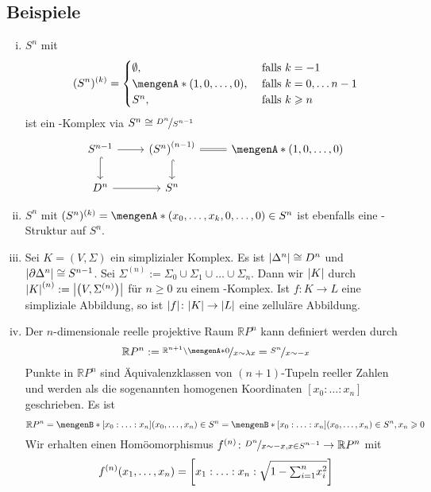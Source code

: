 \subsection[Beispiele für \CW-Komplexe]{Beispiele} %
\label{sub:115}
\begin{enumerate}[(i)]
	\item $S^n$ mit 
	\[
		(S^n)^{(k)} = \begin{cases}
			\emptyset, &\text{ falls }k=-1\\
			\set{(1,0,\ldots ,0)}, &\text{ falls } k=0, \ldots n-1 \\
			S^n , &\text{ falls } k \ge n 
		\end{cases}
	\]
	ist ein \CW-Komplex via $S^n \cong \nicefrac{D^n}{S^{n-1}}$
	\[
		\begin{tikzcd}
			S^{n-1} \rar \dar[hook] & \enbrace*{S^n}^{(n-1)} \rar[equal] \dar[hook] & \set{(1,0,\ldots ,0)}   \\
			D^n \rar & S^n  
		\end{tikzcd}
	\]
	\item $S^n$ mit $(S^n)^{(k)} = \set{(x_0, \ldots ,x_k,0, \ldots ,0) \in S^n} $ ist ebenfalls eine \CW-Struktur auf $S^n$.
	\item Sei $K=(V,\Sigma)$ ein simplizialer Komplex. Es ist $\abs*{\Delta^n} \cong D^n$ und $\abs*{\partial \Delta^n} \cong S^{n-1}$. Sei 
	$\Sigma^{(n)} := \Sigma_0 \cup \Sigma_1 \cup \ldots \cup \Sigma_n$. Dann wir $\abs*{K}$ durch $\abs*{K}^{(n)} := \abs*{\enbrace*{V,\Sigma^{(n)}}}$ für $n \ge 0$ zu 
	einem \CW-Komplex. Ist $f \colon K \to L$ eine simpliziale Abbildung, so ist $\abs*{f} \colon \abs*{K} \to \abs*{L}$ eine zelluläre Abbildung.
	\item Der $n$-dimensionale reelle projektive Raum $\mathds{R}P^n$ kann definiert werden durch 
	\[
		\mathds{R}P^n := \nicefrac{\mathds{R}^{n+1} \setminus \set{0}}{x \sim \lambda x} = \nicefrac{S^n}{x \sim -x}
	\]
	Punkte in $\mathds{R}P^n$ sind Äquivalenzklassen von $(n+1)$-Tupeln reeller Zahlen und werden als die sogenannten homogenen Koordinaten $[x_0 : \ldots : x_n]$ 
	geschrieben. Es ist 
	\[
		\mathds{R}P^n = \set[{[x_0 : \ldots : x_n]}]{(x_0, \ldots ,x_n) \in S^n \rule{0cm}{1em}} 
		= \set[{[x_0 : \ldots : x_n]}]{(x_0, \ldots ,x_n) \in S^n, x_n \ge 0 \rule{0cm}{1em}}
	\]
	Wir erhalten einen Homöomorphismus $f^{(n)} \colon \nicefrac{D^n}{x \sim -x, x \in S^{n-1}} \to \mathds{R}P^n$ mit
	\[
		f^{(n)} \enbrace*{x_1, \ldots ,x_n} = \benbrace*{x_1 : \ldots : x_n : \sqrt{1- {\textstyle\sum\nolimits_{i=1}^{n}} x_i^2}} 
\]
\end{enumerate}
